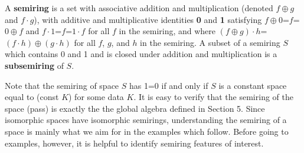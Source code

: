 \documentclass[11pt]{article}
\begin{document}
\begin{definition}
A {\bf semiring} is a set with associative addition and multiplication (denoted $f\oplus g$ and $f\cdot g$), with additive and 
multiplicative identities {\bf 0} and {\bf 1} satisfying $f\oplus 0$=$f$=$0\oplus f$ and $f\cdot 1$=$f$=$1\cdot f$ for all $f$ in the semiring, and where 
$(f\oplus g)\cdot h$=$(f\cdot h)\oplus (g\cdot h)$ for all $f$, $g$, and $h$ in the semiring.  
A subset of a semiring $S$ which contains 0 and 1 and is closed under addition and multiplication is a {\bf subsemiring} of $S$.   
\end{definition} 
\noindent 
Note that the semiring of space $S$ has 1=0 if and only if $S$ is a constant space equal to (const $K$) for some data $K$.  
It is easy to verify that the semiring of the space (pass) is exactly the the global algebra defined in Section 5.  Since isomorphic spaces have 
isomorphic semirings, understanding the semiring of a space is mainly what we aim for in the examples which follow.  Before going to examples, however, it is helpful 
to identify semiring features of interest. 
\end{document}
